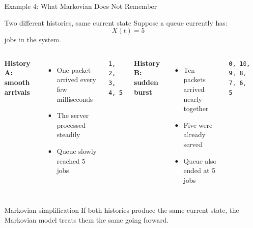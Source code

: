 \documentclass[aspectratio=169]{beamer}
\begin{document}
\begin{frame}{Example 4: What Markovian Does Not Remember}
\tiny

\begin{block}{Two different histories, same current state}
Suppose a queue currently has:
\[
X(t) = 5
\]
jobs in the system.
\end{block}

\vspace{0.15cm}

\begin{columns}[T]

\textbf{History A: smooth arrivals}

\begin{itemize}
    \item One packet arrived every few milliseconds
    \item The server processed steadily
    \item Queue slowly reached 5 jobs
\end{itemize}

\vspace{0.1cm}

\begin{center}
\texttt{1, 2, 3, 4, 5}
\end{center}


\textbf{History B: sudden burst}

\begin{itemize}
    \item Ten packets arrived nearly together
    \item Five were already served
    \item Queue also ended at 5 jobs
\end{itemize}

\vspace{0.1cm}

\begin{center}
\texttt{0, 10, 9, 8, 7, 6, 5}
\end{center}

\end{columns}

\vspace{0.2cm}

\begin{alertblock}{Markovian simplification}
If both histories produce the same current state, the Markovian model treats them the same going forward.
\end{alertblock}

\end{frame}
\end{document}
